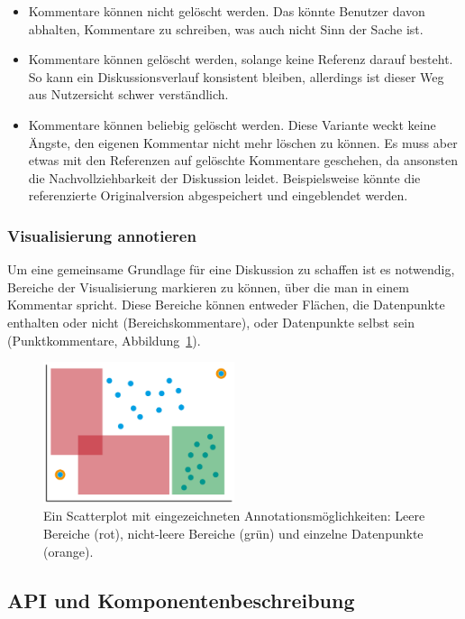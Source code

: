 \documentclass[
	headsepline,
	footsepline,
	fontsize=12pt,
	bibliography=totoc
]{scrbook}
\begin{document}
\begin{itemize}
	\item Kommentare können nicht gelöscht werden. Das könnte Benutzer davon abhalten, Kommentare zu schreiben, was auch nicht Sinn der Sache ist.
	\item Kommentare können gelöscht werden, solange keine Referenz darauf besteht. So kann ein Diskussionsverlauf konsistent bleiben, allerdings ist dieser Weg aus Nutzersicht schwer verständlich.
	\item Kommentare können beliebig gelöscht werden. Diese Variante weckt keine Ängste, den eigenen Kommentar nicht mehr löschen zu können. Es muss aber etwas mit den Referenzen auf gelöschte Kommentare geschehen, da ansonsten die Nachvollziehbarkeit der Diskussion leidet. Beispielsweise könnte die referenzierte Originalversion abgespeichert und eingeblendet werden.
\end{itemize}

\subsubsection{Visualisierung annotieren}

Um eine gemeinsame Grundlage für eine Diskussion zu schaffen ist es notwendig, Bereiche der Visualisierung markieren zu können, über die man in einem Kommentar spricht. Diese Bereiche können entweder Flächen, die Datenpunkte enthalten oder nicht (Bereichskommentare), oder Datenpunkte selbst sein (Punktkommentare, Abbildung~\ref{figure:datenbereiche}).

\begin{figure}[htbp]
   \centering
   \includegraphics[width=0.5\textwidth]{images/konzeption-datenbereiche.png}
   \caption{Ein Scatterplot mit eingezeichneten Annotationsmöglichkeiten: Leere Bereiche (rot), nicht-leere Bereiche (grün) und einzelne Datenpunkte (orange).}
   \label{figure:datenbereiche}
\end{figure}

\subsection{API und Komponentenbeschreibung}
\label{section:konzeption:kommentare:api}
\end{document}
